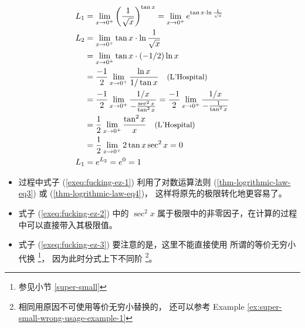 \begin{example}
    \label{ex:fucking-ez-limit-but-I-dont-know-how-to-evaluate}
    \begin{align}
        \notag L_1 &= \lim_{x \to 0^+} \left(\frac{1}{\sqrt{x}}\right)^{\tan x} = \lim_{x \to 0^+} e^{\tan x \cdot \ln \frac{1}{\sqrt{x}}}\\
        \label{exeq:fucking-ez-1} L_2 &= \lim_{x \to 0^+} \tan x \cdot \ln \frac{1}{\sqrt{x}} \\
        \notag     &= \lim_{x \to 0^+} \tan x \cdot (-1/2) \ln x\\
        \notag     &= \frac{-1}{2} \lim_{x \to 0^+} \frac{\ln x}{1/ \tan x} \quad \mbox{\small (L'Hospital)}\\ 
        \label{exeq:fucking-ez-2} &= \frac{-1}{2} \lim_{x \to 0^+} \frac{1/x}{-\frac{\sec^2 x}{\tan^2 x}} = \frac{-1}{2} \lim_{x \to 0^+} \frac{1/x}{-\frac{1}{\tan^2 x}} \\
        \label{exeq:fucking-ez-3} &= \frac{1}{2}  \lim_{x \to 0^+} \frac{\tan^2 x}{x} \quad \mbox{\small (L'Hospital)}\\ 
        \notag     &= \frac{1}{2}  \lim_{x \to 0^+} 2 \tan x \sec^2 x = 0 \\
        \notag L_1 &= e^{L_2} = e^0 = 1
    \end{align}

    \begin{itemize}
        \item 过程中式子 (\ref{exeq:fucking-ez-1}) 利用了对数运算法则 (\ref{thm-logrithmic-law-eq3}) 或 (\ref{thm-logrithmic-law-eq4})，
            这样将原先的极限转化地更容易了。
        \item 式子 (\ref{exeq:fucking-ez-2}) 中的 $\sec^2 x$ 属于极限中的非零因子，在计算的过程中可以直接带入其极限值。
        \item 式子 (\ref{exeq:fucking-ez-3}) 要注意的是，这里不能直接使用
            所谓的等价无穷小代换
            \footnote{参见小节 \ref{super-small}}，
            因为此时分式上下不同阶
            \footnote{
                相同用原因不可使用等价无穷小替换的，
                还可以参考 Example 
                \ref{ex:super-small-wrong-usage-example-1}
            }。
    \end{itemize}
\end{example}
